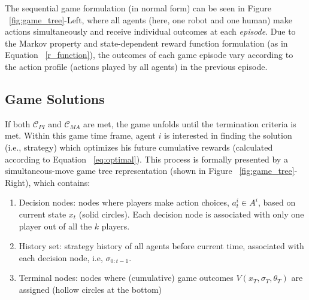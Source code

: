 \documentclass[letterpaper, 10 pt, conference]{ieeeconf}  %
\begin{document}
The sequential game formulation (in normal form) can be seen in Figure 
~\ref{fig:game_tree}-Left, where all agents (here, one robot and one 
human) make actions simultaneously and receive individual outcomes at each 
\textit{episode}. Due to the 
Markov property and state-dependent reward function formulation (as in 
Equation ~\ref{r_function}), the outcomes of each game episode vary according 
to the action profile (actions played by all agents) in the previous episode.

\subsection{Game Solutions}
If both $\mathcal{C}_{PI}$ and $\mathcal{C}_{MA}$ are met, the game unfolds 
until the termination criteria is met. Within this game 
time frame, agent $i$ is interested in finding the solution (i.e., strategy) 
which optimizes his future cumulative rewards (calculated according to Equation 
~\ref{eq:optimal}). This process is formally presented by a
simultaneous-move game tree representation (shown in Figure 
~\ref{fig:game_tree}-Right), which contains:
\begin{enumerate}
  \item Decision nodes: nodes where players make action choices, 
    $a^i_t \in A^i$, based on current state $x_t$ (solid circles). Each decision node is associated with only one player out of all the $k$ players.
  \item History set: strategy history of all agents before current time, associated with each decision node, i.e,  $\sigma_{0:t-1}$. 
  \item Terminal nodes: nodes where (cumulative) game outcomes 
    $V(x_T,\sigma_T,\theta_T)$ are assigned (hollow circles at the bottom)
\end{enumerate}
\end{document}
